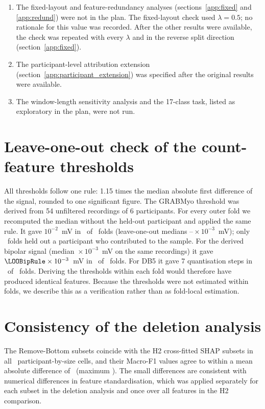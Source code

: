 \documentclass{iopjournal}
\newif\ifshowchanges
\newcommand{\chg}[1]{\ifshowchanges{\color{blue}#1}\else{#1}\fi}
\begin{document}
\begin{enumerate}
\item The fixed-layout and feature-redundancy analyses (sections~\ref{app:fixed} and \ref{app:redund}) were not in the plan. The fixed-layout check used $\lambda = 0.5$; no rationale for this value was recorded. \chg{After the other results were available, the check was repeated with every $\lambda$ and in the reverse split direction (section~\ref{app:fixed}).}
\item The participant-level attribution extension (section~\ref{app:participant_extension}) was specified after the original results were available.
\item The window-length sensitivity analysis and the 17-class task, listed as exploratory in the plan, were not run.
\end{enumerate}

\section{Leave-one-out check of the count-feature thresholds}
\label{app:threshold}
All thresholds follow one rule: 1.15 times the median absolute first difference of the signal, rounded to one significant figure. The GRABMyo threshold was derived from 54 unfiltered recordings of 6 participants. For every outer fold we recomputed the median without the held-out participant and applied the same rule. It gave $10^{-2}$~mV in \LOOMonoIdentical\ of \LOOMonoFolds\ folds (leave-one-out medians \LOOMonoMin--\LOOMonoMax${}\times 10^{-3}$~mV); only \LOOMonoInProbe\ folds held out a participant who contributed to the sample. For the derived bipolar signal (median \LOOBipPooled${}\times 10^{-3}$~mV on the same recordings) it gave $\LOOBipRule \times 10^{-3}$~mV in \LOOBipIdentical\ of \LOOBipFolds\ folds. For DB5 it gave 7 quantisation steps in \LOODBFiveIdentical\ of \LOODBFiveFolds\ folds. Deriving the thresholds within each fold would therefore have produced identical features. Because the thresholds were not estimated within folds, we describe this as a verification rather than as fold-local estimation.

\section{Consistency of the deletion analysis}
\label{app:faith}
The Remove-Bottom subsets coincide with the H2 cross-fitted SHAP subsets in all \FaithProtocolCells\ participant-by-size cells, and their Macro-F1 values agree to within a mean absolute difference of \FaithProtocolMeanDiff\ (maximum \FaithProtocolMaxDiff). The small differences \chg{are consistent with numerical differences in feature standardisation, which was applied} separately for each subset in the deletion analysis and once over all features in the H2 comparison.
\end{document}
